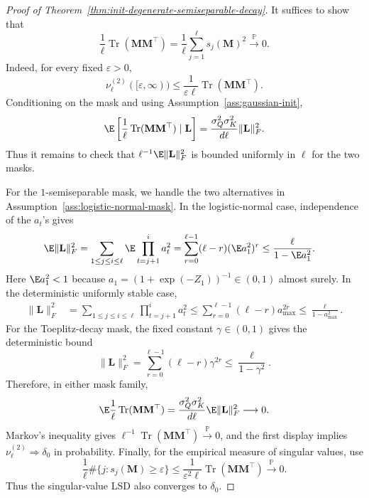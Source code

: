 \documentclass{article}
\newcommand{\Prob}{\mathbb{P}}
\newcommand{\weak}{\Rightarrow}
\newcommand{\bM}{\mathbf{M}}
\newcommand{\bL}{\mathbf{L}}
\theoremstyle{definition}
\theoremstyle{remark}
\begin{document}
\begin{proof}[Proof of Theorem~\ref{thm:init-degenerate-semiseparable-decay}]
It suffices to show that
\[
    \frac1\ell\operatorname{Tr}(\bM\bM^\top)
    =
    \frac1\ell\sum_{j=1}^{\ell}s_j(\bM)^2
    \xrightarrow{\Prob}0.
\]
Indeed, for every fixed $\varepsilon>0$,
\[
    \nu_{\ell}^{(2)}([\varepsilon,\infty))
    \leq
    \frac1{\varepsilon\ell}\operatorname{Tr}(\bM\bM^\top).
\]
Conditioning on the mask and using Assumption~\ref{ass:gaussian-init},
\[
    \E\left[\frac1\ell\operatorname{Tr}(\bM\bM^\top)\mid \bL\right]
    =
    \frac{\sigma_Q^2\sigma_K^2}{d\ell}\|\bL\|_F^2.
\]
Thus it remains to check that $\ell^{-1}\E\|\bL\|_F^2$ is bounded uniformly in
$\ell$ for the two masks.

For the $1$-semiseparable mask, we handle the two alternatives in
Assumption~\ref{ass:logistic-normal-mask}.  In the logistic-normal case,
independence of the $a_t$'s gives
\[
\begin{aligned}
\E\|\bL\|_F^2
&=
\sum_{1\leq j\leq i\leq \ell}
\E\prod_{t=j+1}^{i}a_t^2
=
\sum_{r=0}^{\ell-1}(\ell-r)(\E a_1^2)^r
\leq
\frac{\ell}{1-\E a_1^2}.
\end{aligned}
\]
Here $\E a_1^2<1$ because $a_1=(1+\exp(-Z_1))^{-1}\in(0,1)$ almost
surely.  In the deterministic uniformly stable case,
\[
\begin{aligned}
\|\bL\|_F^2
&=
\sum_{1\leq j\leq i\leq \ell}
\prod_{t=j+1}^{i}a_t^2
\leq
\sum_{r=0}^{\ell-1}(\ell-r)a_{\max}^{2r}
\leq
\frac{\ell}{1-a_{\max}^2}.
\end{aligned}
\]
For the Toeplitz-decay mask, the fixed constant $\gamma\in(0,1)$ gives the
deterministic bound
\[
    \|\bL\|_F^2
    =
    \sum_{r=0}^{\ell-1}(\ell-r)\gamma^{2r}
    \leq
    \frac{\ell}{1-\gamma^2}.
\]
Therefore, in either mask family,
\[
    \E\frac1\ell\operatorname{Tr}(\bM\bM^\top)
    =
    \frac{\sigma_Q^2\sigma_K^2}{d\ell}\E\|\bL\|_F^2
    \longrightarrow0.
\]
Markov's inequality gives
$\ell^{-1}\operatorname{Tr}(\bM\bM^\top)\xrightarrow{\Prob}0$, and the first
display implies $\nu_{\ell}^{(2)}\weak\delta_0$ in probability.  Finally, for
the empirical measure of singular values, use
\[
    \frac1\ell\#\{j:s_j(\bM)\geq\varepsilon\}
    \leq
    \frac1{\varepsilon^2\ell}\operatorname{Tr}(\bM\bM^\top)
    \xrightarrow{\Prob}0.
\]
Thus the singular-value LSD also converges to $\delta_0$.
\end{proof}
\end{document}

